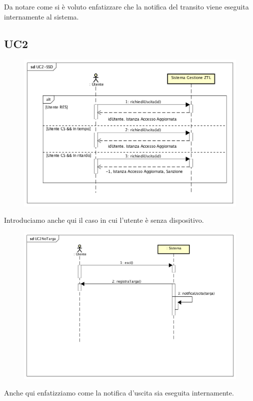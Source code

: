 \documentclass[12pt, letterpaper]{article}
\begin{document}
\noindent
Da notare come si è voluto enfatizzare che 
la notifica del transito viene eseguita 
internamente al sistema.

\subsection{UC2}
\begin{figure}[H]
    \centering
    \includegraphics[scale=0.50]{UC2-SSD}
\end{figure}

\noindent 
Introduciamo anche qui il caso in cui 
l'utente è senza dispositivo.
\begin{figure}[H]
    \centering
    \includegraphics[scale=0.50]{UC2NoTarga}
\end{figure}

\noindent
Anche qui enfatizziamo come la notifica 
d'uscita sia eseguita internamente.
\end{document}

